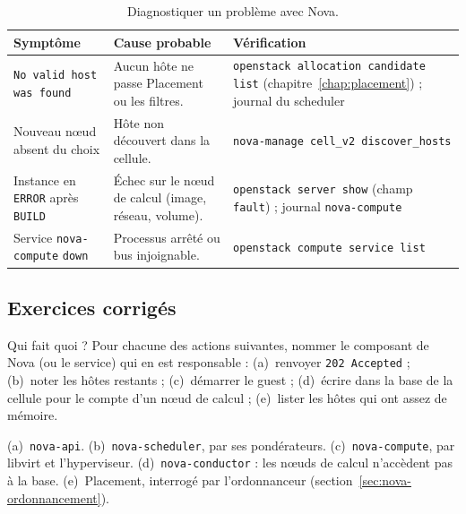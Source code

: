 \begin{table}[!ht]
\centering
\renewcommand{\arraystretch}{1.3}
\begin{tabular}{@{}>{\raggedright\arraybackslash}p{4.6cm}>{\raggedright\arraybackslash}p{5.6cm}>{\raggedright\arraybackslash}p{5.3cm}@{}}
\toprule
\textbf{Symptôme} & \textbf{Cause probable} & \textbf{Vérification} \\
\midrule
\texttt{No valid host was found} & Aucun hôte ne passe Placement ou les filtres. & \texttt{openstack allocation candidate list} (chapitre~\ref{chap:placement}) ; journal du scheduler \\
Nouveau nœud absent du choix & Hôte non découvert dans la cellule. & \texttt{nova-manage cell\_v2 discover\_hosts} \\
Instance en \texttt{ERROR} après \texttt{BUILD} & Échec sur le nœud de calcul (image, réseau, volume). & \texttt{openstack server show} (champ \texttt{fault}) ; journal \texttt{nova-compute} \\
Service \texttt{nova-compute} \texttt{down} & Processus arrêté ou bus injoignable. & \texttt{openstack compute service list} \\
\bottomrule
\end{tabular}
\caption{Diagnostiquer un problème avec Nova.}
\label{tab:nova-pannes}
\end{table}

\subsection{Exercices corrigés}\label{sec:nova-exercices}

\begin{exercice}{Qui fait quoi ?}\label{ex:nova-roles}
Pour chacune des actions suivantes, nommer le composant de Nova (ou le service) qui en est responsable :
(a)~renvoyer \texttt{202 Accepted} ; (b)~noter les hôtes restants ; (c)~démarrer le guest ; (d)~écrire dans la base de
la cellule pour le compte d'un nœud de calcul ; (e)~lister les hôtes qui ont assez de mémoire.
\end{exercice}
\begin{correction}
(a)~\texttt{nova-api}. (b)~\texttt{nova-scheduler}, par ses pondérateurs. (c)~\texttt{nova-compute}, par libvirt et
l'hyperviseur. (d)~\texttt{nova-conductor} : les nœuds de calcul n'accèdent pas à la base. (e)~Placement,
interrogé par l'ordonnanceur (section~\ref{sec:nova-ordonnancement}).
\end{correction}


